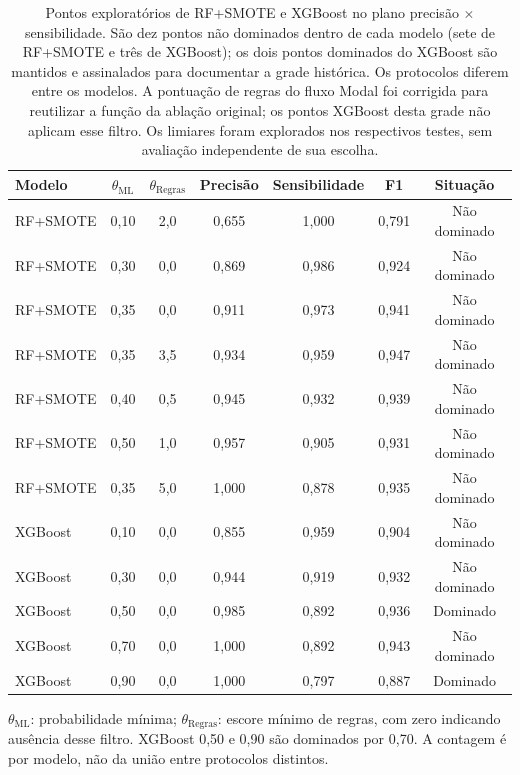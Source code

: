 \begin{table}[htbp]
\centering
\caption{Pontos exploratórios de RF+SMOTE e XGBoost no plano precisão $\times$ sensibilidade. São dez pontos não dominados dentro de cada modelo (sete de RF+SMOTE e três de XGBoost); os dois pontos dominados do XGBoost são mantidos e assinalados para documentar a grade histórica. Os protocolos diferem entre os modelos. A pontuação de regras do fluxo Modal foi corrigida para reutilizar a função da ablação original; os pontos XGBoost desta grade não aplicam esse filtro. Os limiares foram explorados nos respectivos testes, sem avaliação independente de sua escolha.}
\label{tab:pareto-frontier}
\small
\begin{tabular}{lcccccc}
\toprule
Modelo & $\theta_{\text{ML}}$ & $\theta_{\text{Regras}}$ & Precisão & Sensibilidade & F1 & Situação \\
\midrule
RF+SMOTE & 0,10 & 2,0 & 0,655 & 1,000 & 0,791 & Não dominado \\
RF+SMOTE & 0,30 & 0,0 & 0,869 & 0,986 & 0,924 & Não dominado \\
RF+SMOTE & 0,35 & 0,0 & 0,911 & 0,973 & 0,941 & Não dominado \\
RF+SMOTE & 0,35 & 3,5 & 0,934 & 0,959 & 0,947 & Não dominado \\
RF+SMOTE & 0,40 & 0,5 & 0,945 & 0,932 & 0,939 & Não dominado \\
RF+SMOTE & 0,50 & 1,0 & 0,957 & 0,905 & 0,931 & Não dominado \\
RF+SMOTE & 0,35 & 5,0 & 1,000 & 0,878 & 0,935 & Não dominado \\
XGBoost & 0,10 & 0,0 & 0,855 & 0,959 & 0,904 & Não dominado \\
XGBoost & 0,30 & 0,0 & 0,944 & 0,919 & 0,932 & Não dominado \\
XGBoost & 0,50 & 0,0 & 0,985 & 0,892 & 0,936 & Dominado \\
XGBoost & 0,70 & 0,0 & 1,000 & 0,892 & 0,943 & Não dominado \\
XGBoost & 0,90 & 0,0 & 1,000 & 0,797 & 0,887 & Dominado \\
\bottomrule
\end{tabular}
\par\footnotesize $\theta_{\text{ML}}$: probabilidade mínima; $\theta_{\text{Regras}}$: escore mínimo de regras, com zero indicando ausência desse filtro. XGBoost 0,50 e 0,90 são dominados por 0,70. A contagem é por modelo, não da união entre protocolos distintos.
\end{table}

